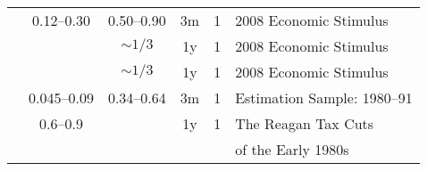 \begin{tabular}{p{8cm}ccccl}
\citet{parker_consumer_2013}& \multicolumn{1}{c}{0.12--0.30} & \multicolumn{1}{c}{0.50--0.90} & 3m & 1  &2008 Economic Stimulus \\
\citet{Sahmetal:2008TaxRebates}&   & \multicolumn{1}{c}{$\sim1/3$} & 1y & 1  &2008 Economic Stimulus \\
\citet{ssBang} &  & \multicolumn{1}{c}{$\sim1/3$} & 1y & 1  & 2008 Economic Stimulus \\
\citet{souleles_response_1999} & \multicolumn{1}{c}{0.045--0.09}  & \multicolumn{1}{c}{0.34--0.64} & 3m & 1  &Estimation Sample: 1980--91\\
\citet{souleles:responseToReaganCuts} & \multicolumn{1}{c}{0.6--0.9} &  & 1y & 1  &The Reagan Tax Cuts \\
& & & & & of the Early 1980s\\
\bottomrule
\end{tabular} 



